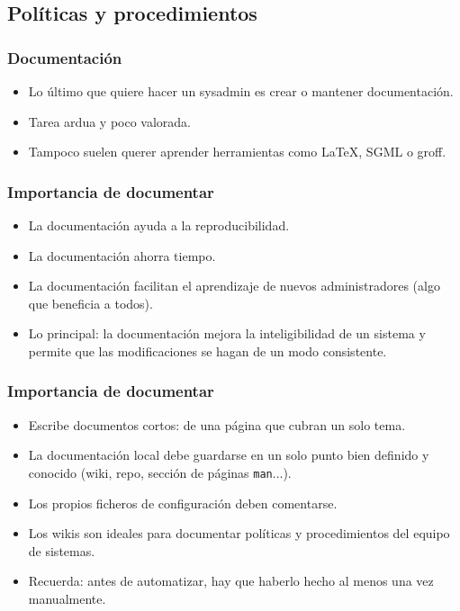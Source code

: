\documentclass{beamer}
\begin{document}
\subsection{Políticas y procedimientos}

\begin{frame}
\frametitle{Documentación}

\begin{itemize}
\item Lo último que quiere hacer un sysadmin es crear o mantener documentación. 
\item Tarea ardua y poco valorada. 
\item Tampoco suelen querer aprender herramientas como LaTeX, SGML o groff.
\end{itemize}

\end{frame}


\begin{frame}
\frametitle{Importancia de documentar}

\begin{itemize}
\item La documentación ayuda a la reproducibilidad. 
\item La documentación ahorra tiempo. 
\item La documentación facilitan el aprendizaje de nuevos administradores (algo que beneficia a todos). 
\item Lo principal: la documentación mejora la inteligibilidad de un sistema y permite que
	las modificaciones se hagan de un modo consistente.
\end{itemize}

\end{frame}


\begin{frame}
\frametitle{Importancia de documentar}

\begin{itemize}
\item Escribe documentos cortos: de una página que cubran un solo tema.
\item La documentación local debe guardarse en un solo punto bien definido y conocido (wiki, repo, sección de páginas \texttt{man}...).
\item Los propios ficheros de configuración deben comentarse.
\item Los wikis son ideales para documentar políticas y procedimientos del equipo de sistemas.
\item Recuerda: antes de automatizar, hay que haberlo hecho al menos una vez manualmente.
\end{itemize}

\end{frame}
\end{document}
